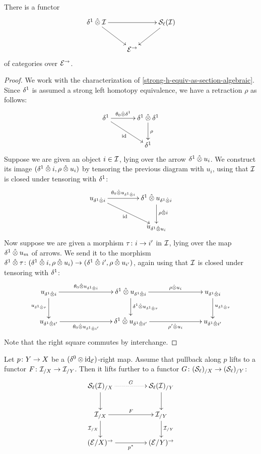 \documentclass[reqno,10pt,a4paper,oneside]{amsart}
\begin{document}
\begin{lemma}
\label{horn-times-gen-to-she}
There is a functor 
\[
\xymatrix{
\rcyl \hatotimes \cal{I} \ar[dr] \ar[rr] & & \cal{S}_\ell(\cal{I}) \ar[dl] \\ 
 & \catE^\to & }
 \] 
 of categories over $\catE^{\to}$.
\end{lemma}

\begin{proof}
We work with the characterization of \cref{strong-h-equiv-as-section-algebraic}.
Since $\rcyl$ is assumed a strong left homotopy equivalence, we have a retraction $\rho$ as follows:
\[
\xymatrix@C+1em{
  \rcyl
  \ar[r]^-{\thetal \hatotimes \rcyl}
  \ar[dr]_{\id}
&
  \rcyl \hatotimes \rcyl \ar[d]^{\rho}
\\&
  \rcyl
}
\]
Suppose we are given an object $i \in \cal{I}$, lying over the arrow $\rcyl \hatotimes u_i$.
We construct its image $(\rcyl \hatotimes i, \rho \hatotimes u_i)$ by tensoring the previous diagram with $u_i$, using that $\cal{I}$ is closed under tensoring with $\rcyl$:
\[
\xymatrix@C+2em{
 u_{\rcyl \hatotimes i}
  \ar[r]^-{\thetal \hatotimes u_{\rcyl \hatotimes i}}
  \ar[dr]_{\id}
&
  \rcyl \hatotimes u_{\rcyl \hatotimes i} 
  \ar[d]^{\rho \hatotimes i}
\\&
  u_{\rcyl \hatotimes u_i}
  }
\]
Now suppose we are given a morphism $\tau \co i \to i'$ in $\cal{I}$, lying over the map $\rcyl \hatotimes u_m$ of arrows.
We send it to the morphism $\rcyl \hatotimes \tau \co (\rcyl \hatotimes i, \rho \hatotimes u_i) \to (\rcyl \hatotimes i', \rho \hatotimes u_{i'})$, again using that $\cal{I}$ is closed under tensoring with $\rcyl$:
\[
\xymatrix@C+5em{
  u_{\rcyl \hatotimes i}
  \ar[r]^-{\thetal \hatotimes u_{\rcyl \hatotimes i}}
  \ar[d]_{u_{\rcyl \hatotimes \tau}}
&
  \rcyl \hatotimes u_{\rcyl \hatotimes i}
  \ar[r]^-{\rho \hatotimes u_i}
  \ar[d]^{\rcyl \hatotimes u_{\rcyl \hatotimes \tau}}
&
  u_{\rcyl \hatotimes i}
  \ar[d]^{u_{\rcyl \hatotimes \tau}}
\\
  u_{\rcyl \hatotimes i'}
  \ar[r]_-{\thetal \hatotimes u_{\rcyl \hatotimes i'}}
&
  \rcyl \hatotimes u_{\rcyl \hatotimes i'} 
  \ar[r]_-{\rho' \hatotimes u_i}
&
  u_{\rcyl \hatotimes i'}
}
\]
Note that the right square commutes by interchange.
\end{proof}



\begin{lemma}
\label{strong-h-equiv-base-change-along-fibration}
Let $p \co Y \to X$ be a $(\lcyl \otimes \id_{\calE})$-right map.
Assume that pullback  along $p$ lifts to a functor $F \co \cal{I}_{/X} \to \cal{I}_{/Y}$.
Then it lifts further to a functor $G \co (\cal{S}_\ell)_{/X} \to (\cal{S}_\ell)_{/Y}$:
\[
\xymatrix@C+2em{
  \cal{S}_\ell(\cal{I})_{/X}
  \ar@{.>}[r]^{G}
  \ar[d]
&
  \cal{S}_\ell(\cal{I})_{/Y}
  \ar[d]
\\
  \cal{I}_{/X}
  \ar[r]^{F}
  \ar[d]_{\cal{I}_{/X}}
&
  \cal{I}_{/Y}
  \ar[d]^{\cal{I}_{/Y}}
\\
  (\catE / X)^{\to}
  \ar[r]_{p^*}
&
  (\catE / Y)^{\to}
}
\]
\end{lemma}
\end{document}
